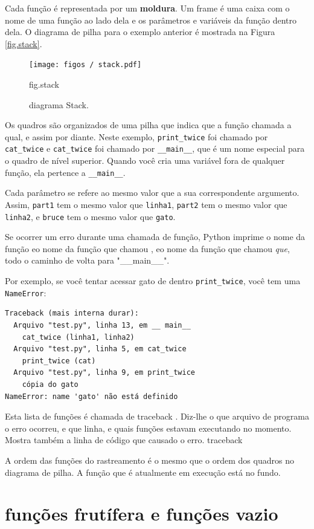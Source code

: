\documentclass[10pt]{book}
\begin{document}
\begin{exercise}
Cada função é representada por um {\bf moldura}. Um frame é uma caixa
com o nome de uma função
ao lado dela e os parâmetros e variáveis ​​da função dentro dela.
O diagrama de pilha para o
exemplo anterior é mostrada na Figura ~ \ref {fig.stack}.

\begin{figure}
\centerline
{\texttt{[image: figos / stack.pdf]}}
\caption{diagrama Stack.}
\label{} fig.stack
\end{figure}


Os quadros são organizados de uma pilha que indica que a função
chamada a qual, e assim por diante. Neste exemplo, \verb "print_twice"
foi chamado por \verb "cat_twice" e \verb "cat_twice" foi chamado por 
\Verb "__main__", que é um nome especial para o quadro de nível superior. Quando
você cria uma variável fora de qualquer função, ela pertence a 
\Verb "__main__".

Cada parâmetro se refere ao mesmo valor que a sua correspondente
argumento. Assim, {\tt part1} tem o mesmo valor que
{\tt linha1}, {\tt part2} tem o mesmo valor que {\tt linha2},
e {\tt bruce} tem o mesmo valor que {\tt gato}.

Se ocorrer um erro durante uma chamada de função, Python imprime o
nome da função eo nome da função que chamou
, eo nome da função que chamou {\em que}, todo o
caminho de volta para \verbo "__main__".

Por exemplo, se você tentar acessar {\tt} gato de dentro 
\Verb "print_twice", você tem uma {\tt NameError}:

\begin{verbatim}
Traceback (mais interna durar):
  Arquivo "test.py", linha 13, em __ main__
    cat_twice (linha1, linha2)
  Arquivo "test.py", linha 5, em cat_twice
    print_twice (cat)
  Arquivo "test.py", linha 9, em print_twice
    cópia do gato
NameError: name 'gato' não está definido
\end{verbatim}
%
Esta lista de funções é chamada de traceback {\bf}. Diz-lhe o que
arquivo de programa o erro ocorreu, e que linha, e quais funções
estavam executando no momento. Mostra também a linha de código que
causado o erro.
\index{} traceback

A ordem das funções do rastreamento é o mesmo que o
ordem dos quadros no diagrama de pilha. A função que é
atualmente em execução está no fundo.


\section{funções frutífera e funções vazio}


\end{exercise}
\end{document}
